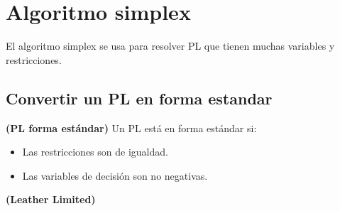 \documentclass[../main.tex]{subfiles}
\begin{document}
\section{Algoritmo simplex} 
    El algoritmo simplex se usa para resolver PL que tienen muchas variables y restricciones.
    
    \subsection{Convertir un PL en forma estandar}
        \begin{definition} \textbf{(PL forma estándar)}
            Un PL está en forma estándar si:
            \begin{itemize}
                \item Las restricciones son de igualdad.
                \item Las variables de decisión son no negativas.
            \end{itemize}
        \end{definition}

        \begin{example} \textbf{(Leather Limited)}\\
            
        \end{example}
\end{document}
